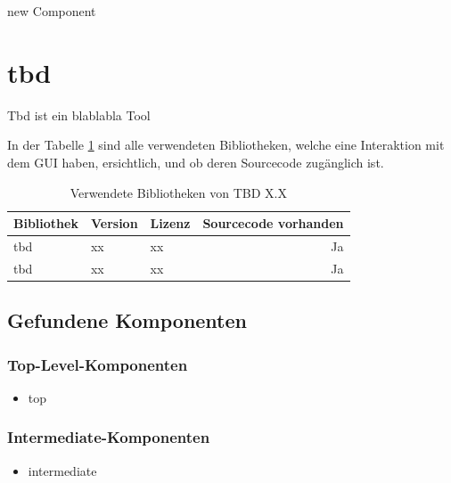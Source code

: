   \begin{description}
    \item[new Component]
  \end{description}
  
  \section{tbd}
  
  Tbd ist ein blablabla Tool
  
  In der Tabelle \ref{tab:bibliothekenTbd} sind alle verwendeten
  Bibliotheken, welche eine Interaktion mit dem \ac{GUI} haben, ersichtlich,
  und ob deren Sourcecode zugänglich ist.
  
  \begin{table}[ht]
    \begin{center}
      \begin{tabular}{lllr}
        \toprule
        Bibliothek & Version & Lizenz & Sourcecode vorhanden \\
        \midrule
        tbd & xx & xx & Ja\\
        tbd & xx & xx & Ja\\
        \bottomrule
      \end{tabular}
      \caption{Verwendete Bibliotheken von TBD X.X}
      \label{tab:bibliothekenTbd}
    \end{center}
  \end{table}
  
  \subsection{Gefundene Komponenten}
  
  \subsubsection{Top-Level-Komponenten}
  
  \begin{itemize}
    \item top
  \end{itemize}
  
  \subsubsection{Intermediate-Komponenten}
  
  \begin{itemize}
    \item intermediate
  \end{itemize}
  
